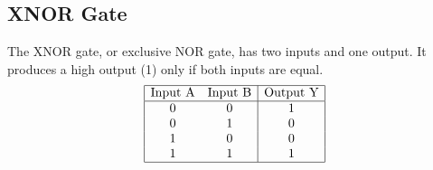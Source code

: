 \documentclass{article}
\begin{document}
\subsection*{XNOR Gate}

The XNOR gate, or exclusive NOR gate, has two inputs and one output. It produces a high output (1) only if both inputs are equal.
\[
\begin{array}{|cc|c|}
\hline
\text{Input A} & \text{Input B} & \text{Output Y} \\
\hline
0 & 0 & 1 \\
0 & 1 & 0 \\
1 & 0 & 0 \\
1 & 1 & 1 \\
\hline
\end{array}
\]
\end{document}
